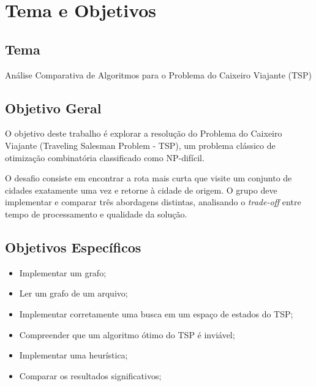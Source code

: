 \chapter{Tema e Objetivos}

\section{Tema}
Análise Comparativa de Algoritmos para o Problema do Caixeiro Viajante (TSP)
\section{Objetivo Geral}
O objetivo deste trabalho é explorar a resolução do Problema do Caixeiro Viajante (Traveling Salesman Problem - TSP), um problema clássico de otimização combinatória classificado como NP-difícil. 

O desafio consiste em encontrar a rota mais curta que visite um conjunto de cidades exatamente uma vez e retorne à cidade de origem. 
O grupo deve implementar e comparar três abordagens distintas, analisando o \textit{trade-off} entre tempo de processamento e qualidade da solução.

\section{Objetivos Específicos}
\begin{itemize}
    \item Implementar um grafo;
    \item Ler um grafo de um arquivo;
    \item Implementar corretamente uma busca em um espaço de estados do TSP;
    \item Compreender que um algoritmo ótimo do TSP é inviável;
    \item Implementar uma heurística;
    \item Comparar os resultados significativos;
\end{itemize}